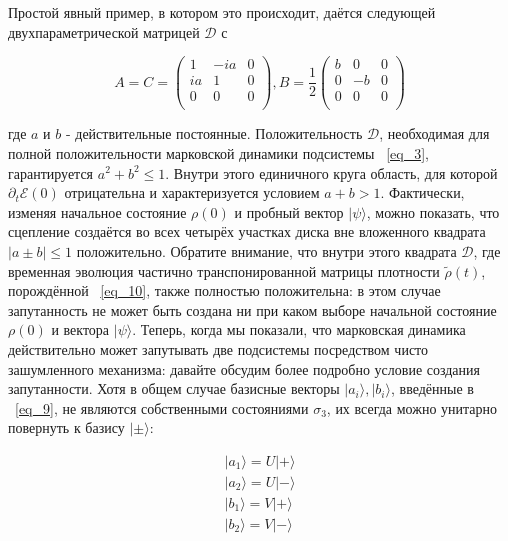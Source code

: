 \documentclass[11pt]{article}
\begin{document}
Простой явный пример, в котором это происходит, даётся следующей двухпараметрической матрицей $\mathscr{D}$ с

\begin{equation}
A=C= \left(
\begin{array}{ccc}
1 & -ia & 0 \\
ia & 1 & 0 \\
0 & 0 & 0 \\
\end{array}
\right),
B = \frac{1}{2}\left(
\begin{array}{ccc}
b & 0 & 0 \\
0 & -b & 0 \\
0 & 0 & 0 \\
\end{array}
\right)
\label{eq_18}
\end{equation}

где $a$ и $b$ - действительные постоянные. Положительность $\mathscr{D}$, необходимая для полной положительности марковской динамики подсистемы ~\ref{eq_3}, гарантируется $a^2+b^2 \le 1$. Внутри этого единичного круга область, для которой $\partial_t \mathscr{E}(0)$ отрицательна и характеризуется условием $a+b >1$. Фактически, изменяя начальное состояние $\rho(0)$ и пробный вектор $|\psi\rangle$, можно показать, что сцепление создаётся во всех четырёх участках диска вне вложенного квадрата $|a \pm b| \le 1$ положительно. Обратите внимание, что внутри этого квадрата $\mathscr{D}$, где временная эволюция частично транспонированной матрицы плотности $\tilde{\rho}(t)$, порождённой ~\ref{eq_10}, также полностью положительна: в этом случае запутанность не может быть создана ни при каком выборе начальной состояние $\rho(0)$ и вектора $|\psi \rangle$.
Теперь, когда мы показали, что марковская динамика действительно может запутывать две подсистемы посредством чисто зашумленного механизма: давайте обсудим более подробно условие создания запутанности. Хотя в общем случае базисные векторы $|a_i \rangle, |b_i\rangle$, введённые в ~\ref{eq_9}, не являются собственными состояниями $\sigma_3$, их всегда можно унитарно повернуть к базису $|\pm \rangle$:

\begin{equation}
\begin{gathered}
|a_1\rangle = U|+\rangle \\
|a_2\rangle = U|-\rangle \\
|b_1\rangle = V|+\rangle \\
|b_2\rangle = V|-\rangle \\
\end{gathered}
\label{eq_19}
\end{equation}
\end{document}
